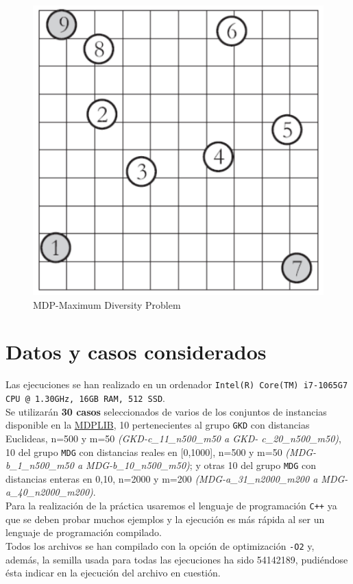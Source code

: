 \begin{figure}[H]
	\centering
	\includegraphics[scale=0.35]{img/mdp.png}
	\caption{MDP-Maximum Diversity Problem}
\end{figure}


\section{Datos y casos considerados}
\hspace{1.5cm} Las ejecuciones se han realizado en un ordenador \texttt{Intel(R) Core(TM) i7-1065G7 CPU @ 1.30GHz, 16GB RAM, 512 SSD}. \\


Se utilizarán \textbf{30 casos} seleccionados de varios de los conjuntos de instancias disponible en la \href{http://www.optsicom.es/mdp/}{MDPLIB}, 10 pertenecientes al grupo \texttt{GKD} con distancias Euclideas, n=500 y m=50 \textit{(GKD-c\_11\_n500\_m50 a GKD-
c\_20\_n500\_m50)}, 10 del grupo \texttt{MDG} con distancias reales en [0,1000], n=500 y m=50
\textit{(MDG-b\_1\_n500\_m50 a MDG-b\_10\_n500\_m50)}; y otras 10 del grupo \texttt{MDG} con distancias enteras en {0,10}, n=2000 y m=200 \textit{(MDG-a\_31\_n2000\_m200 a MDG-
a\_40\_n2000\_m200)}. \\


Para la realización de la práctica usaremos el lenguaje de programación \texttt{C++} ya que se deben probar muchos ejemplos y la ejecución es más rápida al ser un lenguaje de programación compilado. \\
Todos los archivos se han compilado con la opción de optimización \texttt{-O2} y, además,  la semilla usada para todas
las ejecuciones ha sido 54142189, pudiéndose ésta indicar en la ejecución del archivo en cuestión. 






